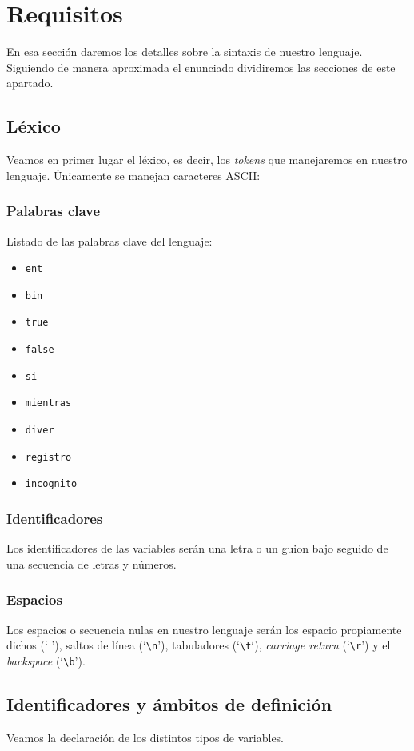\section*{Requisitos}
En esa sección daremos los detalles sobre la sintaxis de nuestro lenguaje.
Siguiendo de manera aproximada el enunciado dividiremos las secciones de este
apartado.

\subsection*{Léxico}
Veamos en primer lugar el léxico, es decir, los \textit{tokens} que manejaremos
en nuestro lenguaje. Únicamente se manejan caracteres ASCII:
\subsubsection*{Palabras clave}
Listado de las palabras clave del lenguaje:
\begin{itemize}
    \item \lstinline{ent}
    \item \lstinline{bin}
    \item \lstinline{true}
    \item \lstinline{false}
    \item \lstinline{si}
    \item \lstinline{mientras}
    \item \lstinline{diver}
    \item \lstinline{registro}
    \item \lstinline{incognito}
\end{itemize}

\subsubsection*{Identificadores}
Los identificadores de las variables serán una letra o un guion bajo seguido de
una secuencia de letras y números.

\subsubsection*{Espacios}
Los espacios o secuencia nulas en nuestro lenguaje serán los espacio propiamente
dichos (` '), saltos de línea (`\lstinline{\n}'), tabuladores
(`\lstinline{\t}`), \textit{carriage return} (`\lstinline{\r}') y el
\textit{backspace} (`\lstinline{\b}').

\subsection*{Identificadores y ámbitos de definición}
Veamos la declaración de los distintos tipos de variables.

